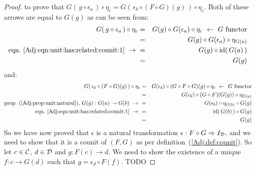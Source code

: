 \begin{proof}
    to prove that $G(\,g\circ\epsilon_{a}\,)\circ\eta_{c}=G(\,\epsilon_{b}
    \circ(F\circ G)(g)\,)\circ\eta_{c}$. Both of these arrows are equal to
    $G(g)$ as can be seen from:
        \begin{eqnarray*}G(\,g\circ\epsilon_{a}\,)\circ\eta_{c}
            &=&G(g)\circ G(\epsilon_{a})\circ\eta_{c}
            \ \leftarrow\ \mbox{$G$ functor}\\
            &=&G(g)\circ G(\epsilon_{a})\circ\eta_{G(a)}\\
            \mbox{eqn.~\ref{Adj:eqn:unit:has:related:counit:1}}\ \to\ 
            &=&G(g)\circ\id(\,G(a)\,)\\
            &=&G(g)
        \end{eqnarray*}
    and:
        \begin{eqnarray*}G(\,\epsilon_{b}\circ(F\circ G)(g)\,)\circ\eta_{c}
            &=&G(\epsilon_{b})\circ(G\circ F\circ G)(g)\circ\eta_{c}
            \ \leftarrow\ \mbox{$G$ functor}\\
            &=&G(\epsilon_{b})\circ(G\circ F)(G(g))\circ\eta_{G(a)}\\
            \mbox{prop.~(\ref{Adj:prop:unit:natural}), $G(g):G(a)\to G(b)$}\ \to\ 
            &=&G(\epsilon_{b})\circ\eta_{G(b)}\circ G(g)\\
            \mbox{eqn.~\ref{Adj:eqn:unit:has:related:counit:1}}\ \to\ 
            &=&\id(\,G(b)\,)\circ G(g)\\
            &=&G(g)
        \end{eqnarray*}
    So we have now proved that $\epsilon$ is a natural transformation
    $\epsilon:F\circ G\Rightarrow I_{\cal D}$, and we need to show that
    it is a counit of $(F,G)$ as per definition~(\ref{Adj:def:counit}).
    So let $c\in\mbox{$\cal C$}$, $d\in\mbox{$\cal D$}$ and $g:F(c)\to d$. We need to show
    the existence of a unique $f:c\to G(d)$ such that $g=\epsilon_{d}\circ F(f)$.
    TODO
\end{proof}
